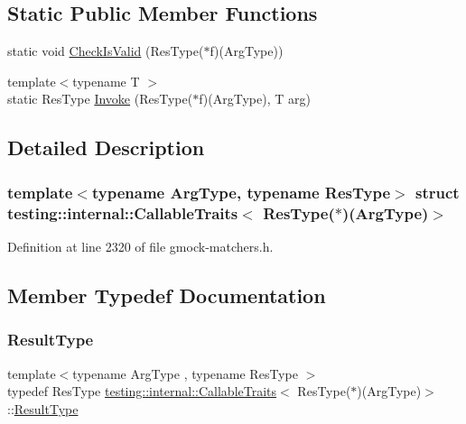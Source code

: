 \subsection*{Static Public Member Functions}
\begin{DoxyCompactItemize}
\item 
static void \hyperlink{structtesting_1_1internal_1_1CallableTraits_3_01ResType_07_5_08_07ArgType_08_4_a184f502a16b227a2ec16e49bd23b2ded}{Check\+Is\+Valid} (Res\+Type($\ast$f)(Arg\+Type))
\item 
{\footnotesize template$<$typename T $>$ }\\static Res\+Type \hyperlink{structtesting_1_1internal_1_1CallableTraits_3_01ResType_07_5_08_07ArgType_08_4_a8a61fc15cde62a0f06b2ee5a0a805c6c}{Invoke} (Res\+Type($\ast$f)(Arg\+Type), T arg)
\end{DoxyCompactItemize}


\subsection{Detailed Description}
\subsubsection*{template$<$typename Arg\+Type, typename Res\+Type$>$\newline
struct testing\+::internal\+::\+Callable\+Traits$<$ Res\+Type($\ast$)(\+Arg\+Type)$>$}



Definition at line 2320 of file gmock-\/matchers.\+h.



\subsection{Member Typedef Documentation}
\mbox{\label{structtesting_1_1internal_1_1CallableTraits_3_01ResType_07_5_08_07ArgType_08_4_a1959235d286e9c9bb57c1c1139a0cbd8}} 
\subsubsection{\texorpdfstring{Result\+Type}{ResultType}}
{\footnotesize\ttfamily template$<$typename Arg\+Type , typename Res\+Type $>$ \\
typedef Res\+Type \hyperlink{structtesting_1_1internal_1_1CallableTraits}{testing\+::internal\+::\+Callable\+Traits}$<$ Res\+Type($\ast$)(Arg\+Type)$>$\+::\hyperlink{structtesting_1_1internal_1_1CallableTraits_3_01ResType_07_5_08_07ArgType_08_4_a1959235d286e9c9bb57c1c1139a0cbd8}{Result\+Type}}




